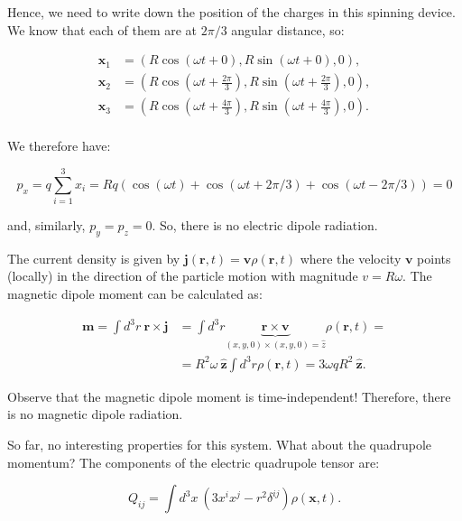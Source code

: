 Hence, we need to write down the position of the charges in this spinning device. We know that each of them are at $2\pi/3$ angular distance, so:

\begin{equation}
	\begin{split}
		\mathbf{x}_{1} &= (R \cos \left(\omega t+0\right),R \sin \left(\omega t+0\right), 0),\\
		\mathbf{x}_{2} &= (R \cos \left(\omega t+\tfrac{2\pi}{3}\right),R \sin \left(\omega t+\tfrac{2\pi}{3}\right), 0),\\
		\mathbf{x}_{3} &= (R \cos \left(\omega t+\tfrac{4\pi}{3}\right),R \sin \left(\omega t+\tfrac{4\pi}{3}\right), 0).\\
	\end{split}
\end{equation}

We therefore have:

\begin{equation}
	p_{x}=q \sum_{i=1}^{3} x_{i}=R q(\cos (\omega t)+\cos (\omega t+2 \pi / 3)+\cos (\omega t-2 \pi / 3))=0
\end{equation}

and, similarly, $p_{y}= p_{z}=0$. So, there is no electric dipole radiation.

The current density is given by $\mathbf{j}(\mathbf{r}, t)=\mathbf{v} \rho(\mathbf{r}, t)$ where the velocity $\mathbf{v}$ points (locally) in the direction of the particle motion with magnitude $v=R \omega$. The magnetic dipole moment can be calculated as:

\begin{equation}
	\begin{split}
		\mathbf{m}= \int d^{3} r \:\mathbf{r} \times \mathbf{j}&=\int d^{3} r \underbrace{\mathbf{r} \times \mathbf{v}}_{(x,y,0)\times (x,y,0)= \hat{z}} \rho(\mathbf{r}, t)=\\
		&= R^{2} \omega \:\hat{\mathbf{z}} \int d^{3} r \rho(\mathbf{r}, t)=3 \omega q R^{2} \:\hat{\mathbf{z}} .
	\end{split}
\end{equation}

Observe that the magnetic dipole moment is time-independent! Therefore, there is no magnetic dipole radiation.

So far, no interesting properties for this system. What about the quadrupole momentum? The components of the electric quadrupole tensor are:

\begin{equation}
	Q_{i j}= \int d^{3} x \: \left(3 x^{i}x^{j} - r^{2} \delta^{ij}\right)\rho(\mathbf{x}, t).
\end{equation}

